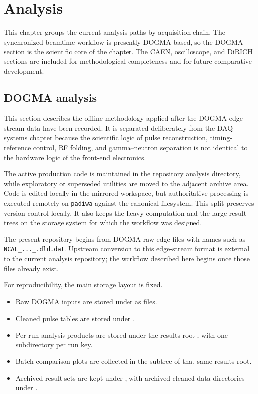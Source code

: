 \chapter{Analysis}
\label{chap:analysis}

This chapter groups the current analysis paths by acquisition chain. The synchronized beamtime workflow is presently DOGMA based, so the DOGMA section is the scientific core of the chapter. The CAEN, oscilloscope, and DiRICH sections are included for methodological completeness and for future comparative development.

\section{DOGMA analysis}

This section describes the offline methodology applied after the DOGMA edge-stream data have been recorded. It is separated deliberately from the DAQ-systems chapter because the scientific logic of pulse reconstruction, timing-reference control, RF folding, and gamma--neutron separation is not identical to the hardware logic of the front-end electronics.

The active production code is maintained in the repository analysis directory, while exploratory or superseded utilities are moved to the adjacent archive area. Code is edited locally in the mirrored workspace, but authoritative processing is executed remotely on \texttt{padiwa} against the canonical  filesystem. This split preserves version control locally. It also keeps the heavy computation and the large result trees on the storage system for which the workflow was designed.

The present repository begins from DOGMA raw edge files with names such as \texttt{NCAL\_...\_.dld.dat}. Upstream conversion to this edge-stream format is external to the current analysis repository; the workflow described here begins once those files already exist.

For reproducibility, the main storage layout is fixed.

\begin{itemize}
\item Raw DOGMA inputs are stored under  as  files.
\item Cleaned pulse tables are stored under .
\item Per-run analysis products are stored under the results root , with one subdirectory per run key.
\item Batch-comparison plots are collected in the  subtree of that same results root.
\item Archived result sets are kept under , with archived cleaned-data directories under .
\end{itemize}

